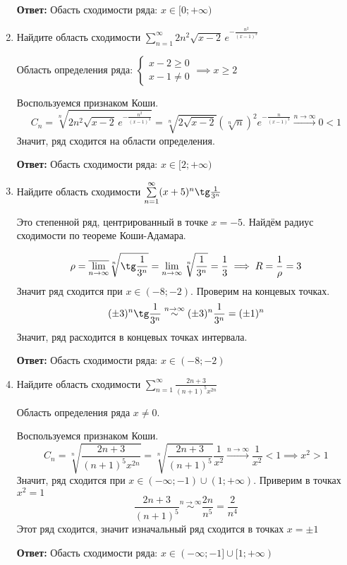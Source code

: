 \documentclass[10pt]{article} %
\begin{document}
\begin{large}
\begin{enumerate}
\textbf{Ответ:} Обасть сходимости ряда: $ x \in [0; +\infty) $

\item Найдите область сходимости $ \sum\limits_{n=1}^{\infty} 2n^2 \sqrt{x-2} \, e^{-\frac{n^2}{(x-1)^3}} $

Область определения ряда: $
\begin{cases}
    x - 2 \geq 0 \\
    x - 1 \neq 0
\end{cases}
\implies x \geq 2  $

Воспользуемся признаком Коши.
\[ C_n = \sqrt[n]{2n^2 \sqrt{x-2} \, e^{-\frac{n^2}{(x-1)^3}} } = \sqrt[n]{2\sqrt{x-2}}(\sqrt[n]{n})^2 e^{-\frac{n}{(x-1)^3}} \xrightarrow{n\to\infty} 0 < 1 \]
Значит, ряд сходится на области определения.

\textbf{Ответ:} Обасть сходимости ряда: $ x \in [2; +\infty) $

\item Найдите область сходимости $ \sum\limits_{n=1}^{\infty} (x+5)^n \tg \frac{1}{3^n} $

Это степенной ряд, центрированный в точке $ x = -5 $. Найдём радиус сходимости по теореме Коши-Адамара.

\[ \rho = \overline{\lim_{n\to\infty}} \sqrt[n]{\tg \frac{1}{3^n}} = \lim_{n\to\infty}\sqrt[n]{ \frac{1}{3^n} } = \frac{1}{3} \implies R = \frac{1}{\rho} = 3 \]
Значит ряд сходится при $ x \in (-8; -2) $. Проверим на концевых точках.
\[ (\pm 3)^n \tg \frac{1}{3^n} \stackrel{n\to\infty}{\sim} (\pm 3)^n \frac{1}{3^n} = (\pm 1)^n \]
Значит, ряд расходится в концевых точках интервала.

\textbf{Ответ:} Обасть сходимости ряда: $ x \in (-8; -2) $

\item Найдите область сходимости $ \sum\limits_{n=1}^{\infty} \frac{2n+3}{(n+1)^5x^{2n}} $

Область определения ряда $ x \neq 0 $.

Воспользуемся признаком Коши.
\[ C_n = \sqrt[n]{ \frac{2n+3}{(n+1)^5x^{2n}} } = \sqrt[n]{\frac{2n+3}{(n+1)^5}} \frac{1}{x^2} \xrightarrow{n\to\infty} \frac{1}{x^2} < 1 \implies x^2 > 1 \]
Значит, ряд сходится при $ x \in (-\infty; -1) \cup (1; +\infty) $. Приверим в точках $ x^2 = 1 $
\[ \frac{2n+3}{(n+1)^5} \stackrel{n\to\infty}{\sim} \frac{2n}{n^5} = \frac{2}{n^4} \]
Этот ряд сходится, значит изначальный ряд сходится в точках $ x = \pm 1 $

\textbf{Ответ:} Обасть сходимости ряда: $ x \in (-\infty; -1] \cup [1; +\infty) $


\end{enumerate}

\begin{verbatim}


\end{verbatim}

\end{large}  
\end{document}
